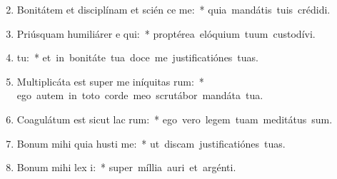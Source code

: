 \begin{flushleft}
\begin{enumerate}[leftmargin=*]
\setcounter{enumi}{1}

\item Bonitátem et disciplínam et scién ce me:~* \mbox{quia mandátis tuis crédidi.}
\item Priúsquam humiliárer e qui:~* \mbox{proptérea elóquium tuum custodívi.}
\item {}  tu:~* \mbox{et in bonitáte tua doce me justificatiónes tuas.}
\item Multiplicáta est super me iníquitas rum:~* \mbox{ego autem in toto corde meo scrutábor mandáta tua.}
\item Coagulátum est sicut lac  rum:~* \mbox{ego vero legem tuam meditátus sum.}
\item Bonum mihi quia husti me:~* \mbox{ut discam justificatiónes tuas.}
\item Bonum mihi lex  i:~* \mbox{super míllia auri et argénti.}


\end{enumerate}
\end{flushleft}

